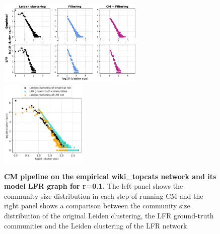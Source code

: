 \documentclass[a4paper]{article}   	%
\begin{document}
\begin{figure}[h!]
\centering
\includegraphics[width=0.62\textwidth]{figs/wiki_topcats_cm_steps_lfr1.pdf}
\includegraphics[width=0.37\textwidth]{figs/wiki_topcats_1_cm_size.pdf}
\caption[CM pipeline on the wiki\_topcats  network and its model LFR graph for r=0.1]{\textbf{CM pipeline on the empirical wiki\_topcats network and its model LFR graph for r=0.1.} The left panel shows the community size distribution in each step of running CM and the right panel shows a comparison between the community size distribution of the original Leiden clustering, the LFR ground-truth communities and the Leiden clustering of the LFR network.}
\label{fig:wikitopcats-cm-lfr-1}
\end{figure}
\end{document}
